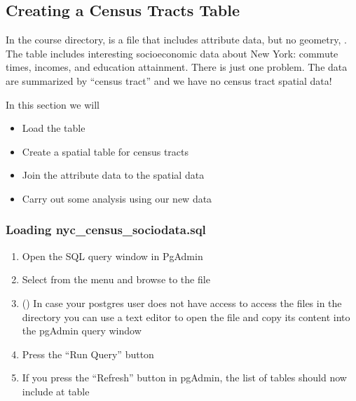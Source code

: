 \documentclass[a4paper,11pt,english]{sphinxmanual}
\begin{document}
\subsection{Creating a Census Tracts Table}
\label{\detokenize{advanced:creating-a-census-tracts-table}}\label{\detokenize{advanced:creatingtractstable}}
In the course  directory, is a file that includes attribute data, but no geometry, . The table includes interesting socioeconomic data about New York: commute times, incomes, and education attainment. There is just one problem. The data are summarized by “census tract” and we have no census tract spatial data!

In this section we will
\begin{itemize}
\item {} 
Load the  table

\item {} 
Create a spatial table for census tracts

\item {} 
Join the attribute data to the spatial data

\item {} 
Carry out some analysis using our new data

\end{itemize}


\subsubsection{Loading nyc\_census\_sociodata.sql}
\label{\detokenize{advanced:loading-nyc-census-sociodata-sql}}\begin{enumerate}
\def\theenumi{\arabic{enumi}}
\def\labelenumi{\theenumi .}
\makeatletter\def\p@enumii{\p@enumi \theenumi .}\makeatother
\item {} 
Open the SQL query window in PgAdmin

\item {} 
Select  from the menu and browse to the  file

\item {} 
() In case your postgres user does not have access to access the files in the directory you can use a text editor to open the  file and copy its content into the pgAdmin query window

\item {} 
Press the “Run Query” button

\item {} 
If you press the “Refresh” button in pgAdmin, the list of tables should now include at  table

\end{enumerate}
\end{document}
